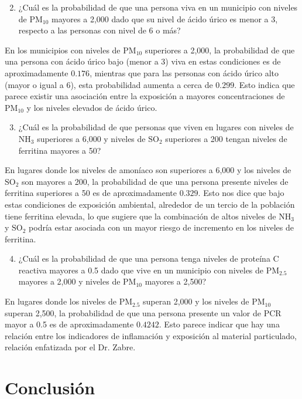 \documentclass[12pt, letterpaper]{report}
\begin{document}
\begin{enumerate}
    \setcounter{enumi}{1}
    \item ¿Cuál es la probabilidad de que una persona viva en un municipio con niveles de \( \text{PM}_{10} \) mayores a 2,000 dado que su nivel de ácido úrico es menor a 3, respecto a las personas con nivel de 6 o más?
\end{enumerate}

En los municipios con niveles de \( \text{PM}_{10} \) superiores a 2,000, la probabilidad de que una persona con ácido úrico bajo (menor a 3) viva en estas condiciones es de aproximadamente \(0.176\), mientras que para las personas con ácido úrico alto (mayor o igual a 6), esta probabilidad aumenta a cerca de \(0.299\). Esto indica que parece existir una asociación entre la exposición a mayores concentraciones de \( \text{PM}_{10} \) y los niveles elevados de ácido úrico.

\begin{enumerate}
    \setcounter{enumi}{2}    
    \item ¿Cuál es la probabilidad de que personas que viven en lugares con niveles de \( \text{NH}_3 \) superiores a 6,000 y niveles de \( \text{SO}_2 \) superiores a 200 tengan niveles de ferritina mayores a 50?
\end{enumerate}

 En lugares donde los niveles de amoníaco son superiores a 6,000 y los niveles de \( \text{SO}_2 \) son mayores a 200, la probabilidad de que una persona presente niveles de ferritina superiores a 50 es de aproximadamente \(0.329\). Esto nos dice que bajo estas condiciones de exposición ambiental, alrededor de un tercio de la población tiene ferritina elevada, lo que sugiere que la combinación de altos niveles de \( \text{NH}_3 \) y \( \text{SO}_2 \) podría estar asociada con un mayor riesgo de incremento en los niveles de ferritina.

\begin{enumerate}
    \setcounter{enumi}{3}    
    \item ¿Cuál es la probabilidad de que una persona tenga niveles de proteína C reactiva mayores a 0.5 dado que vive en un municipio con niveles de \( \text{PM}_{2.5} \) mayores a 2,000 y niveles de \( \text{PM}_{10} \) mayores a 2,500?
\end{enumerate}

En lugares donde los niveles de \( \text{PM}_{2.5} \) superan 2,000 y los niveles de \( \text{PM}_{10} \) superan 2,500, la probabilidad de que una persona presente un valor de PCR mayor a 0.5 es de aproximadamente \(0.4242\). Esto parece indicar que hay una relación entre los indicadores de inflamación y exposición al material particulado, relación enfatizada por el Dr. Zabre.





\section*{Conclusión}


\printbibliography[title={Referencias}]
\end{document}
